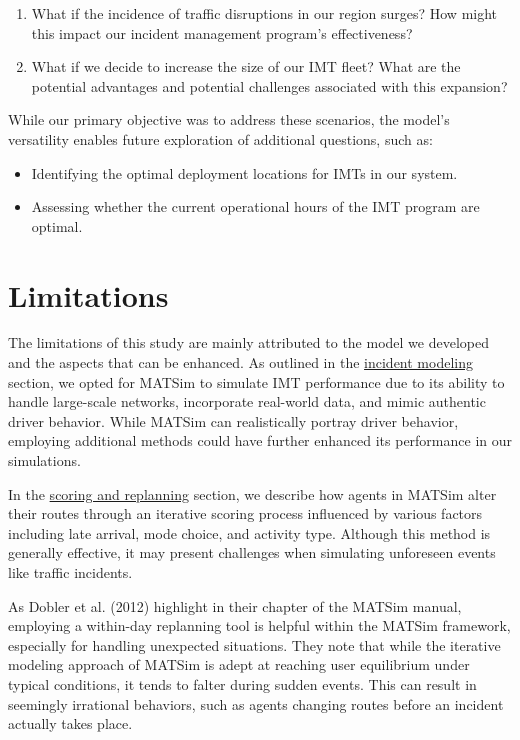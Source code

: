 \documentclass[fancy, oneside, mastersfancy, ms]{byuthesis}
\providecommand{\tightlist}{%
  \setlength{\itemsep}{0pt}\setlength{\parskip}{0pt}}\usepackage{longtable,booktabs,array}
\begin{document}
\begin{enumerate}
\def\labelenumi{\arabic{enumi}.}
\tightlist
\item
  What if the incidence of traffic disruptions in our region surges? How
  might this impact our incident management program's effectiveness?
\item
  What if we decide to increase the size of our IMT fleet? What are the
  potential advantages and potential challenges associated with this
  expansion?
\end{enumerate}

While our primary objective was to address these scenarios, the model's
versatility enables future exploration of additional questions, such as:

\begin{itemize}
\tightlist
\item
  Identifying the optimal deployment locations for IMTs in our system.
\item
  Assessing whether the current operational hours of the IMT program are
  optimal.
\end{itemize}

\hypertarget{sec-limitations}{%
\section{Limitations}\label{sec-limitations}}

The limitations of this study are mainly attributed to the model we
developed and the aspects that can be enhanced. As outlined in the
\protect\hyperlink{sec-inc_modeling}{incident modeling} section, we
opted for MATSim to simulate IMT performance due to its ability to
handle large-scale networks, incorporate real-world data, and mimic
authentic driver behavior. While MATSim can realistically portray driver
behavior, employing additional methods could have further enhanced its
performance in our simulations.

In the \protect\hyperlink{sec-MATSim_Score}{scoring and replanning}
section, we describe how agents in MATSim alter their routes through an
iterative scoring process influenced by various factors including late
arrival, mode choice, and activity type. Although this method is
generally effective, it may present challenges when simulating
unforeseen events like traffic incidents.

As Dobler et al. (2012) highlight in their chapter of the MATSim manual,
employing a within-day replanning tool is helpful within the MATSim
framework, especially for handling unexpected situations. They note that
while the iterative modeling approach of MATSim is adept at reaching
user equilibrium under typical conditions, it tends to falter during
sudden events. This can result in seemingly irrational behaviors, such
as agents changing routes before an incident actually takes place.
\end{document}
